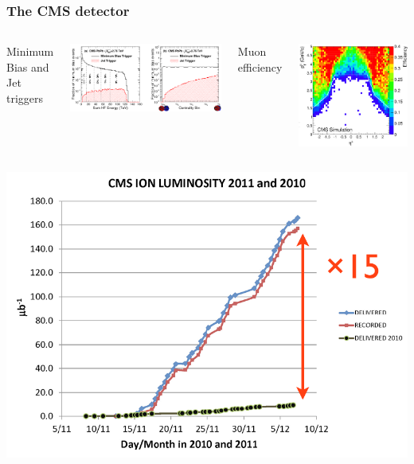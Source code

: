 \documentclass[compress]{beamer}
\begin{document}
\begin{frame}
\frametitle{The CMS detector}

\vspace{0.3 cm}
\begin{columns}
\centering Minimum Bias and Jet triggers

\includegraphics[width=\linewidth]{dijets/trigger_centrality.png}

\centering Muon efficiency

\includegraphics[width=\linewidth]{dimuons/efficiency_pt_eta.png}
\end{columns}

\hfill \includegraphics[height=3.5 cm]{intro/luminosity_oldnew.png}


\end{frame}
\end{document}
